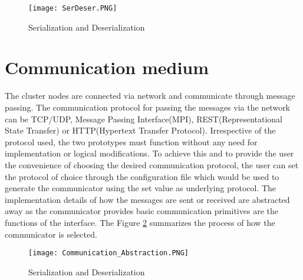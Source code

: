 \begin{figure}[!t]
\centering
\texttt{[image: SerDeser.PNG]}
\caption{Serialization and Deserialization}
\label{fig:SerDeser}
\end{figure}

\section{Communication medium}

The cluster nodes are connected via network and communicate through message passing. The communication protocol for passing the messages via the network can be TCP/UDP, Message Passing Interface(MPI), REST(Representational State Transfer) or HTTP(Hypertext Transfer Protocol). Irrespective of the protocol used, the two prototypes must function without any need for implementation or logical modifications. To achieve this and to provide the user the convenience of choosing the desired communication protocol, the user can set the protocol of choice through the configuration file which would be used to generate the communicator using the set value as underlying protocol. The implementation details of how the messages are sent or received are abstracted away as the communicator provides basic communication primitives are the functions of the interface. The Figure \ref{fig:CommAbs} summarizes the process of how the communicator is selected.

\begin{figure}[!t]
\centering
\texttt{[image: Communication\_Abstraction.PNG]}
\caption{Serialization and Deserialization}
\label{fig:CommAbs}
\end{figure}

  